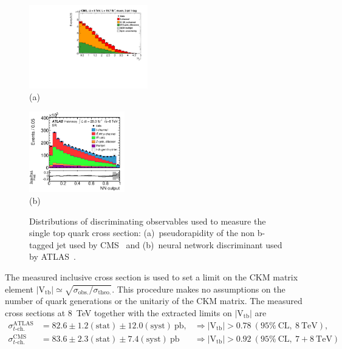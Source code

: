 \documentclass{PoS}
\begin{document}
\begin{figure}[htbp]
\begin{center}
\parbox[t]{0.5\textwidth}{\centering\includegraphics[width=0.46\textwidth]{cms_xsec8/etamuon.pdf}\\(a)}
\parbox[t]{0.42\textwidth}{\centering\includegraphics[width=0.37\textwidth]{atlas_xsec8/nnoutput.pdf}\\(b)}

\end{center}
\caption{\label{fig:fit-xsec-8}Distributions of discriminating observables used to measure the single top quark cross section: (a)~pseudorapidity of the non b-tagged jet used by CMS~\cite{cms-xsec8} and (b)~neural network discriminant used by ATLAS~\cite{atlas-xsec8}.}

\end{figure}

The measured inclusive cross section is used to set a limit on the CKM matrix element $|\mathrm{V_{tb}}|\simeq\sqrt{\sigma_\mathrm{obs.}/\sigma_\mathrm{theo.}}$. This procedure makes no assumptions on the number of quark generations or the unitariy of the CKM matrix. The measured cross sections at 8~TeV together with the extracted limits on $\mathrm{|V_{tb}|}$ are 
\begin{align}
\sigma_{t\mbox{-}\mathrm{ch.}}^\mathrm{ATLAS}&=82.6\pm1.2\mathrm{(stat)}\pm12.0\mathrm{(syst)}~\mathrm{pb}, &\Rightarrow |\mathrm{V_{tb}}|>0.78~\mathrm{(95\%~CL,~8~TeV)}, \\
\sigma_{t\mbox{-}\mathrm{ch.}}^\mathrm{CMS}&=83.6\pm2.3\mathrm{(stat)}\pm7.4\mathrm{(syst)}~\mathrm{pb} &\Rightarrow |\mathrm{V_{tb}}|>0.92~\mathrm{(95\%~CL,~7+8~TeV)}
\end{align}
\end{document}
